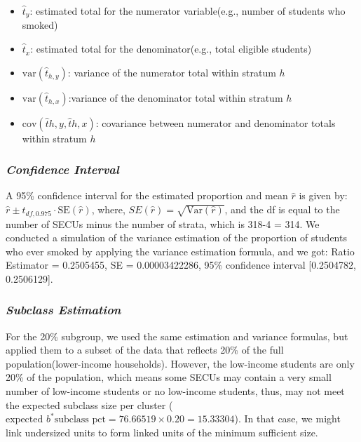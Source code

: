 \documentclass[
  12pt]{article}
\begin{document}
\begin{itemize}
\item
  \(\hat{t}_y\): estimated total for the numerator variable(e.g., number
  of students who smoked)
\item
  \(\hat{t}_x\): estimated total for the denominator(e.g., total
  eligible students)
\item
  \(\text{var}(\hat{t}_{h,y})\): variance of the numerator total within
  stratum \(h\)
\item
  \(\text{var}(\hat{t}_{h,x})\):variance of the denominator total within
  stratum \(h\)
\item
  \(\text{cov}(\hat{t}{h,y}, \hat{t}{h,x})\): covariance between
  numerator and denominator totals within stratum \(h\)
\end{itemize}

\subsubsection{\texorpdfstring{\emph{Confidence
Interval}}{Confidence Interval}}\label{confidence-interval}

A 95\% confidence interval for the estimated proportion and mean
\(\hat{r}\) is given by:
\(\hat{r} \pm t_{df, 0.975} \cdot \text{SE}(\hat{r})\), where,
\(SE(\hat{r}) = \sqrt{\text{Var}(\hat{r})}\), and the df is equal to the
number of SECUs minus the number of strata, which is 318-4 = 314. We
conducted a simulation of the variance estimation of the proportion of
students who ever smoked by applying the variance estimation formula,
and we got: Ratio Estimator = 0.2505455, SE = 0.00003422286, 95\%
confidence interval {[}0.2504782, 0.2506129{]}.

\subsubsection{\texorpdfstring{\emph{Subclass
Estimation}}{Subclass Estimation}}\label{subclass-estimation}

For the 20\% subgroup, we used the same estimation and variance
formulas, but applied them to a subset of the data that reflects 20\% of
the full population(lower-income households). However, the low-income
students are only 20\% of the population, which means some SECUs may
contain a very small number of low-income students or no low-income
students, thus, may not meet the expected subclass size per cluster (
\(\text{expected }b^* \text{subclass pct} = 76.66519 \times 0.20 = 15.33304\)).
In that case, we might link undersized units to form linked units of the
minimum sufficient size.
\end{document}
